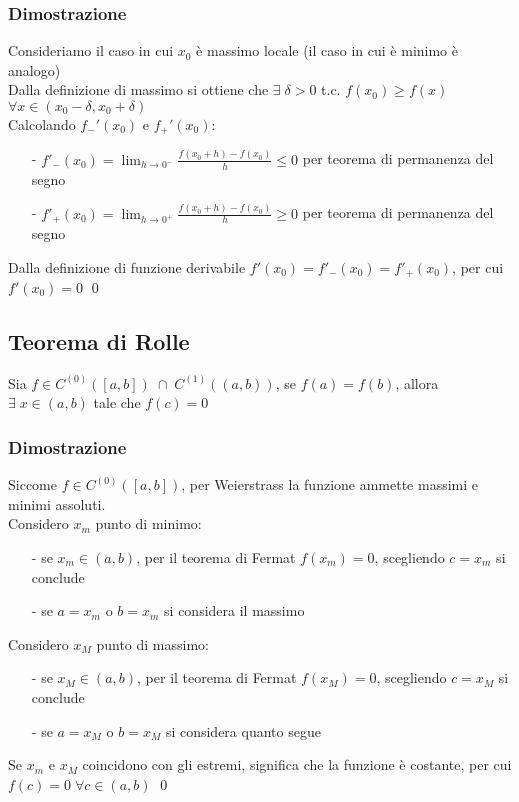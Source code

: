 \documentclass[a4paper]{article}
\newcommand\cont[2]{C^{(#1)} \left({#2}\right)}
\begin{document}
\subsubsection*{Dimostrazione}
Consideriamo il caso in cui \(x_0\) è massimo locale (il caso in cui è minimo è analogo) \\
Dalla definizione di massimo si ottiene che \(\exists \; \delta > 0\) t.c. \(f(x_0) \geq f(x)\) \(\forall x \in \left(x_0 - \delta, x_0 + \delta\right)\) \\
Calcolando \(f_-'(x_0)\) e \(f_+'(x_0)\):
\begin{itemize} [topsep=3pt, itemsep=0pt]
	\item[-] \(\displaystyle f'_-(x_0) = \lim_{h \to 0^-} \frac{f(x_0 + h) - f(x_0)}{h} \leq 0\) per teorema di permanenza del segno
	\item[-] \(\displaystyle f'_+(x_0) = \lim_{h \to 0^+} \frac{f(x_0 + h) - f(x_0)}{h} \geq 0\) per teorema di permanenza del segno
\end{itemize}
Dalla definizione di funzione derivabile \(f'(x_0) = f'_-(x_0) = f'_+(x_0)\), per cui \(f'(x_0) = 0\)
\qed

\subsection{Teorema di Rolle}
Sia \(f \in \cont{0}{\left[a, b\right]} \; \cap \; \cont{1}{\left(a, b\right)}\), se \(f(a) = f(b)\), allora \(\exists \; x \in \left(a, b\right)\)
tale che \(f(c) = 0\)

\subsubsection*{Dimostrazione}
Siccome \(f \in \cont{0}{\left[a, b\right]}\), per Weierstrass la funzione ammette massimi e minimi assoluti. \\
Considero \(x_m\) punto di minimo:
\begin{itemize} [topsep=3pt, itemsep=0pt]
	\item[-] se \(x_m \in \left(a, b\right)\), per il teorema di Fermat \(f(x_m) = 0\), scegliendo \(c = x_m\) si conclude
	\item[-] se \(a = x_m\) o \(b = x_m\) si considera il massimo
\end{itemize}
Considero \(x_M\) punto di massimo:
\begin{itemize} [topsep=3pt, itemsep=0pt]
	\item[-] se \(x_M \in \left(a, b\right)\), per il teorema di Fermat \(f(x_M) = 0\), scegliendo \(c = x_M\) si conclude
	\item[-] se \(a = x_M\) o \(b = x_M\) si considera quanto segue
\end{itemize}
Se \(x_m\) e \(x_M\) coincidono con gli estremi, significa che la funzione è costante, per cui \(f(c) = 0 \; \forall c \in \left(a, b\right)\)
\qed
\end{document}
